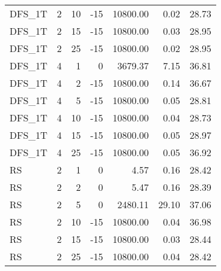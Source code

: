 \begin{center}
\begin{longtable}{lrrrrrr}
  DFS\_1T     & 2 & 10 & -15 & 10800.00 & 0.02 & 28.73 \\ 
  DFS\_1T     & 2 & 15 & -15 & 10800.00 & 0.03 & 28.95 \\ 
  DFS\_1T     & 2 & 25 & -15 & 10800.00 & 0.02 & 28.95 \\ 
  DFS\_1T     & 4 & 1 &   0 & 3679.37 & 7.15 & 36.81 \\ 
  DFS\_1T     & 4 & 2 & -15 & 10800.00 & 0.14 & 36.67 \\ 
  DFS\_1T     & 4 & 5 & -15 & 10800.00 & 0.05 & 28.81 \\ 
  DFS\_1T     & 4 & 10 & -15 & 10800.00 & 0.04 & 28.73 \\ 
  DFS\_1T     & 4 & 15 & -15 & 10800.00 & 0.05 & 28.97 \\ 
  DFS\_1T     & 4 & 25 & -15 & 10800.00 & 0.05 & 36.92 \\ 
  RS     & 2 & 1 &   0 & 4.57 & 0.16 & 28.42 \\ 
  RS     & 2 & 2 &   0 & 5.47 & 0.16 & 28.39 \\ 
  RS     & 2 & 5 &   0 & 2480.11 & 29.10 & 37.06 \\ 
  RS     & 2 & 10 & -15 & 10800.00 & 0.04 & 36.98 \\ 
  RS     & 2 & 15 & -15 & 10800.00 & 0.03 & 28.44 \\ 
  RS     & 2 & 25 & -15 & 10800.00 & 0.04 & 28.42 \\ 

\end{longtable}
\end{center}
